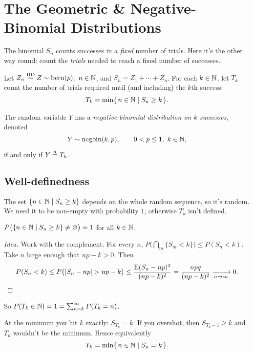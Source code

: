 \section{The Geometric \& Negative-Binomial Distributions}

The binomial $S_n$ counts successes in a \emph{fixed} number of trials. Here it's the other way round: count the \emph{trials} needed to reach a fixed number of successes.

Let $Z_n \overset{\text{IID}}{\sim} Z \sim \operatorname{bern}(p)$, $n \in \mathbb{N}$, and $S_n = Z_1 + \cdots + Z_n$. For each $k \in \mathbb{N}$, let $T_k$ count the number of trials required until (and including) the $k$th success:
\[
T_k = \min\{\, n \in \mathbb{N} \mid S_n \ge k \,\}.
\]

\begin{definition}
The random variable $Y$ has a \emph{negative-binomial distribution on $k$ successes}, denoted
\[
Y \sim \operatorname{negbin}(k,p), \qquad 0 < p \le 1,\ k \in \mathbb{N},
\]
if and only if $Y \overset{d}{=} T_k$.
\end{definition}

\subsection{Well-definedness}

The set $\{n \in \mathbb{N} \mid S_n \ge k\}$ depends on the whole random sequence, so it's random. We need it to be non-empty with probability $1$, otherwise $T_k$ isn't defined.

\begin{proposition}
$P\big(\{n \in \mathbb{N} \mid S_n \ge k\} \ne \varnothing\big) = 1$ for all $k \in \mathbb{N}$.
\end{proposition}
\begin{proof}[Idea]
Work with the complement. For every $n$,
$P\big(\bigcap_{m} \{S_m < k\}\big) \le P(S_n < k)$. Take $n$ large enough that $np - k > 0$. Then
\[
P(S_n < k) \le P\big(|S_n - np| > np - k\big) \le \frac{\mathbb{E}(S_n - np)^2}{(np-k)^2} = \frac{npq}{(np-k)^2} \xrightarrow[n\to\infty]{} 0. \qedhere
\]
\end{proof}

So $P(T_k \in \mathbb{N}) = 1 = \sum_{n=k}^{\infty} P(T_k = n)$.

\begin{remark}
At the minimum you hit $k$ exactly: $S_{T_k} = k$. If you overshot, then $S_{T_k - 1} \ge k$ and $T_k$ wouldn't be the minimum. Hence equivalently
\[
T_k = \min\{\, n \in \mathbb{N} \mid S_n = k \,\}.
\]
\end{remark}

